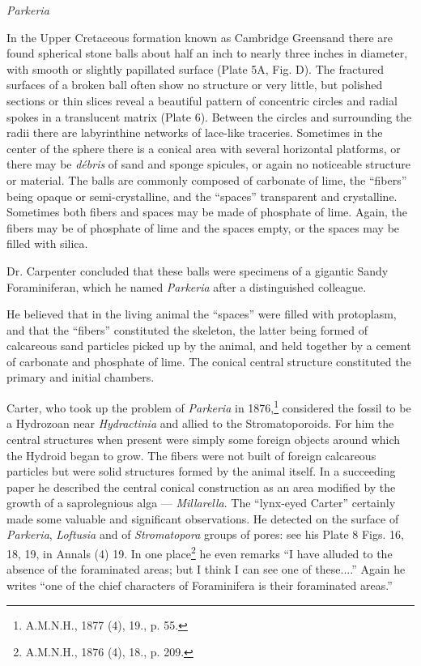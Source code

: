 \documentclass[a4paper, 12pt, oneside]{article}
\begin{document}
\bigskip
\centerline{\emph{Parkeria}}

In the Upper Cretaceous formation known as Cambridge Greensand there are found spherical stone balls about half an inch to nearly three inches in diameter, with smooth or slightly papillated surface (Plate 5A, Fig. D). The fractured surfaces of a broken ball often show no structure or very little, but polished sections or thin slices reveal a beautiful pattern of concentric circles and radial spokes in a translucent matrix (Plate 6). Between the circles and surrounding the radii there are labyrinthine networks of lace-like traceries. Sometimes in the center of the sphere there is a conical area with several horizontal platforms, or there may be \emph{débris} of sand and sponge spicules, or again no noticeable structure or material. The balls are commonly composed of carbonate of lime, the ``fibers'' being opaque or semi-crystalline, and the ``spaces'' transparent and crystalline. Sometimes both fibers and spaces may be made of phosphate of lime. Again, the fibers may be of phosphate of lime and the spaces empty, or the spaces may be filled with silica.

Dr. Carpenter concluded that these balls were specimens of a gigantic Sandy Foraminiferan, which he named \emph{Parkeria} after a distinguished colleague.

He believed that in the living animal the ``spaces'' were filled with protoplasm, and that the ``fibers'' constituted the skeleton, the latter being formed of calcareous sand particles picked up by the animal, and held together by a cement of carbonate and phosphate of lime. The conical central structure constituted the primary and initial chambers.

Carter, who took up the problem of \emph{Parkeria} in 1876,\footnote{A.M.N.H., 1877 (4), 19., p. 55.} considered the fossil to be a Hydrozoan near \emph{Hydractinia} and allied to the Stromatoporoids. For him the central structures when present were simply some foreign objects around which the Hydroid began to grow. The fibers were not built of foreign calcareous particles but were solid structures formed by the animal itself. In a succeeding paper he described the central conical construction as an area modified by the growth of a saprolegnious alga --- \emph{Millarella}. The ``lynx-eyed Carter'' certainly made some valuable and significant observations. He detected on the surface of \emph{Parkeria}, \emph{Loftusia} and of \emph{Stromatopora} groups of pores: see his Plate 8 Figs. 16, 18, 19, in Annals (4) 19. In one place\footnote{A.M.N.H., 1876 (4), 18., p. 209.} he even remarks ``I have alluded to the absence of the foraminated areas; but I think I can see one of these....'' Again he writes ``one of the chief characters of Foraminifera is their foraminated areas.''
\end{document}
